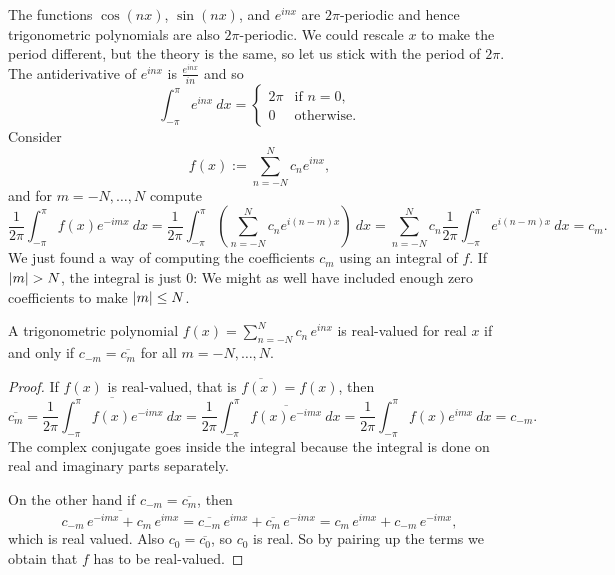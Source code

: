 \medskip

The functions $\cos (nx)$, $\sin (nx)$, and $e^{inx}$ are $2\pi$-periodic
and hence trigonometric
polynomials are also $2\pi$-periodic.
We could rescale $x$ to make the period different, but the theory is the
same, so let us stick with the period of $2\pi$.
The antiderivative of $e^{inx}$ is $\frac{e^{inx}}{in}$ and
so
\begin{equation*}
\int_{-\pi}^\pi e^{inx} ~ dx =
\begin{cases}
2\pi & \text{if } n=0, \\
0    & \text{otherwise.}
\end{cases}
\end{equation*}
Consider
\begin{equation*}
f(x) := \sum_{n=-N}^N c_n e^{inx} ,
\end{equation*}
and for $m=-N,\ldots,N$ compute
\begin{equation*}
\frac{1}{2\pi} \int_{-\pi}^\pi
f(x) e^{-imx} ~ dx
=
\frac{1}{2\pi} \int_{-\pi}^\pi
\left(\sum_{n=-N}^N c_n e^{i(n-m)x}\right) ~ dx
=
\sum_{n=-N}^N
c_n
\frac{1}{2\pi}
\int_{-\pi}^\pi
e^{i(n-m)x}
 ~ dx
=
c_m .
\end{equation*}
We just found a way of computing the coefficients $c_m$ using an integral
of $f$.  If $\lvert {m} \rvert > N$, the integral is just 0: We might as
well have included enough zero coefficients to make $\lvert {m} \rvert \leq N$.

\begin{prop}
A trigonometric polynomial
$f(x) = \sum_{n=-N}^N c_n\, e^{inx}$
is real-valued for real $x$ if
and only if $c_{-m} = \overline{c_m}$ for all $m=-N,\ldots,N$.
\end{prop}

\begin{proof}
If $f(x)$ is real-valued, that is $\overline{f(x)} = f(x)$, then
\begin{equation*}
\overline{c_m}
=
\overline{
\frac{1}{2\pi} \int_{-\pi}^\pi
f(x) e^{-imx} ~ dx
}
=
\frac{1}{2\pi} \int_{-\pi}^\pi
\overline{
f(x) e^{-imx} } ~ dx
=
\frac{1}{2\pi} \int_{-\pi}^\pi
f(x) e^{imx} ~ dx
= c_{-m} .
\end{equation*}
The complex conjugate goes inside the integral because the integral is
done on real and imaginary parts separately.

On the other hand if 
$c_{-m} = \overline{c_m}$, then
\begin{equation*}
\overline{c_{-m}\, e^{-imx}+ c_{m}\, e^{imx}}
=
\overline{c_{-m}}\, e^{imx}+ \overline{c_{m}}\, e^{-imx}
=
c_{m}\, e^{imx}+ c_{-m}\, e^{-imx} ,
\end{equation*}
which is real valued.  Also $c_0 = \overline{c_0}$, so
$c_0$ is real.
So by pairing up the terms we obtain that $f$ has to be real-valued.
\end{proof}


